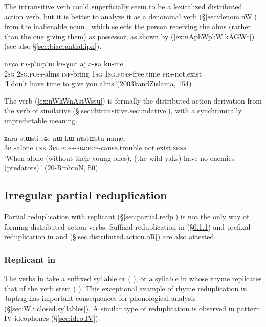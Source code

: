 The intransitive verb  could superficially seem to be a lexicalized distributed action verb, but it is better to analyze it as a denominal verb (§\ref{sec:denom.nW}) from the inalienable noun , which selects the person receiving the alms (rather than the one giving them) as possessor, as shown by (\ref{ex:nAphWphW.kAGWt}) (see also §\ref{sec:biactantial.ipn}).

\begin{exe}
\ex \label{ex:nAphWphW.kAGWt}
\gll nɤʑo nɤ-pʰɯpʰɯ kɤ-ɣɯt aj a-ʁa ku-me \\
\textsc{2sg} \textsc{2sg}.\textsc{poss}-alms \textsc{inf}-bring \textsc{1sg} \textsc{1sg}.\textsc{poss}-free.time \textsc{prs}-not.exist \\
\glt `I don't have time to give you alms.'(2003kandZislama, 154)
\end{exe}

The verb  (\ref{ex:nWkWnAstWstu}) is formally the distributed action derivation from the verb of similative  (§\ref{sec:ditransitive.secundative}), with a synchronically unpredictable meaning.

\begin{exe}
\ex \label{ex:nWkWnAstWstu}
\gll ʑara-stɯsti tɕe nɯ-kɯ-nɤstɯstu maŋe, \\
\textsc{3pl}-alone \textsc{lnk} \textsc{3pl}.\textsc{poss}-\textsc{sbj}:\textsc{pcp}-cause.trouble not.exist:\textsc{sens} \\
\glt `When alone (without their young ones), (the wild yaks) have no enemies (predators).' (20-RmbroN, 50)
\end{exe}

 
\subsection{Irregular partial reduplication}   \label{sec:irregular.reduplication}
Partial reduplication with  replicant (§\ref{sec:partial.redp}) is not the only way of forming distributed action verbs. Suffixal reduplication in  (§\ref{sec.distributed.action.l}) and prefixal reduplication in  and  (§\ref{sec.distributed.action.oR}) are also attested.

\subsubsection{Replicant in } \label{sec.distributed.action.l}
 The verbs in  take a suffixed syllable  or  ( \fl{} ), or a syllable in  whose rhyme replicates that of the verb stem ( \fl{} ). This exceptional example of rhyme reduplication in Japhug has important consequences for phonological analysis (§\ref{sec:W.i.closed.syllables}). A similar type of reduplication is observed in pattern IV ideophones (§\ref{sec:ideo.IV}).

